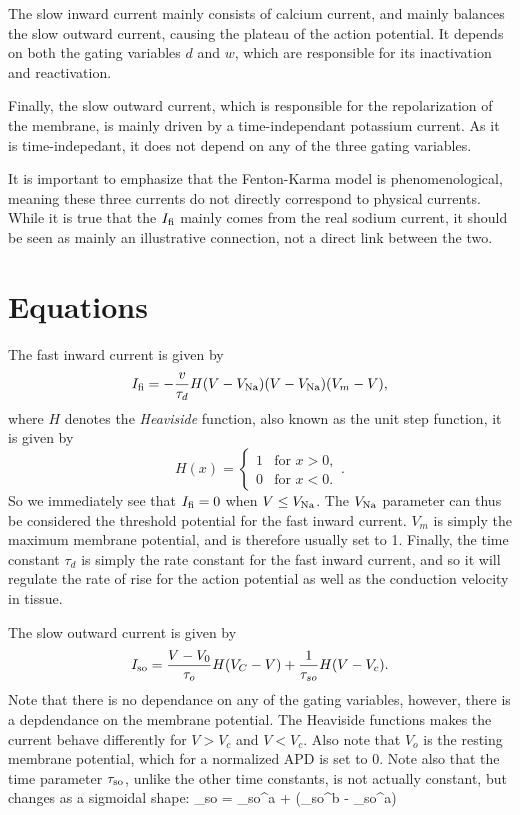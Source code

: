 \documentclass[a4paper, 11pt, notitlepage, english]{article}
\begin{document}
The slow inward current mainly consists of calcium current, and mainly balances the slow outward current, causing the plateau of the action potential. It depends on both the gating variables $d$ and $w$, which are responsible for its inactivation and reactivation.

Finally, the slow outward current, which is responsible for the repolarization of the membrane, is mainly driven by a time-independant potassium current. As it is time-indepedant, it does not depend on any of the three gating variables.

It is important to emphasize that the Fenton-Karma model is phenomenological, meaning these three currents do not directly correspond to physical currents. While it is true that the $I_{\rm fi}$ mainly comes from the real sodium current, it should be seen as mainly an illustrative connection, not a direct link between the two.

\section*{Equations}

The fast inward current is given by
$$I_{\rm fi} = -\frac{v}{\tau_d}H(V-V_{\rm Na})(V-V_{\rm Na})(V_m - V),$$
where $H$ denotes the \emph{Heaviside} function, also known as the unit step function, it is given by
$$H(x) = \begin{cases}
    1 & \mbox{for } x > 0, \\
    0 & \mbox{for } x < 0.
\end{cases}.$$
So we immediately see that $I_{\rm fi} = 0$ when $V \leq V_{\rm Na}$. The $V_{\rm Na}$ parameter can thus be considered the threshold potential for the fast inward current. $V_m$ is simply the maximum membrane potential, and is therefore usually set to 1. Finally, the time constant $\tau_d$ is simply the rate constant for the fast inward current, and so it will regulate the rate of rise for the action potential as well as the conduction velocity in tissue.

The slow outward current is given by
$$I_{\rm so} = \frac{V-V_0}{\tau_o}H(V_C-V) + \frac{1}{\tau_{so}}H(V-V_c).$$
Note that there is no dependance on any of the gating variables, however, there is a depdendance on the membrane potential. The Heaviside functions makes the current behave differently for $V > V_c$ and $V < V_c$. Also note that $V_o$ is the resting membrane potential, which for a normalized APD is set to 0. Note also that the time parameter $\tau_{\rm so}$, unlike the other time constants, is not actually constant, but changes as a sigmoidal shape:
$$\tau_{\rm so} = \tau_{\rm so}^a + (\tau_{\rm so}^b - \tau_{\rm so}^a)\bigg[1 + \tanh\big(k_{\tau_{\rm so}}}(V-V_{\rm so})\big)\bigg]
\end{document}
